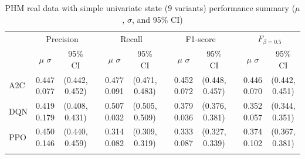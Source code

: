 \documentclass[12pt,oneside]{book}
\renewcommand{\arraystretch}{1.5}
\begin{document}
\begin{table}[htbp]
    \centering
    \caption{PHM real data with simple univariate state (9 variants) performance summary ($\mu$, $\sigma$, and 95\% CI)}
    \label{tab:a2-phm-ss-summary}
    \setlength{\tabcolsep}{5pt}
    {\renewcommand{\arraystretch}{1.2}
    \begin{tabular}{@{}l cc c cc c cc c cc@{}}
        \arrayrulecolor{black!40}\toprule
        & \multicolumn{2}{c}{Precision} &  & \multicolumn{2}{c}{Recall} & & \multicolumn{2}{c}{F1-score} &  & \multicolumn{2}{c}{$F_{\beta=0.5}$} \\
        \cmidrule{2-3} \cmidrule{5-6} \cmidrule{8-9} \cmidrule{11-12}
        & \makecell{$\mu$ \\ $\sigma$} & 95\% CI & & \makecell{$\mu$ \\ $\sigma$} & 95\% CI & & \makecell{$\mu$ \\ $\sigma$} & 95\% CI & & \makecell{$\mu$ \\ $\sigma$} & 95\% CI \\ \midrule
        A2C & \makecell{0.447 \\ 0.077} & \makecell{(0.442,\\0.452)} & & \makecell{0.477 \\ 0.091} & \makecell{(0.471,\\0.483)} & & \makecell{0.452 \\ 0.072} & \makecell{(0.448,\\0.457)} & & \makecell{0.446 \\ 0.070} & \makecell{(0.442,\\0.451)} \\ \arrayrulecolor{gray!30}\midrule
        DQN & \makecell{0.419 \\ 0.179} & \makecell{(0.408,\\0.431)} & & \makecell{0.507 \\ 0.032} & \makecell{(0.505,\\0.509)} & & \makecell{0.379 \\ 0.036} & \makecell{(0.376,\\0.381)} & & \makecell{0.352 \\ 0.057} & \makecell{(0.344,\\0.351)} \\ \arrayrulecolor{gray!30}\midrule
        PPO & \makecell{0.450 \\ 0.146} & \makecell{(0.440,\\0.459)} & & \makecell{0.314 \\ 0.082} & \makecell{(0.309,\\0.319)} & & \makecell{0.333 \\ 0.087} & \makecell{(0.327,\\0.339)} & & \makecell{0.374 \\ 0.102} & \makecell{(0.367,\\0.381)} \\ \arrayrulecolor{gray!30}\midrule

\end{tabular}}
\end{table}
\end{document}
